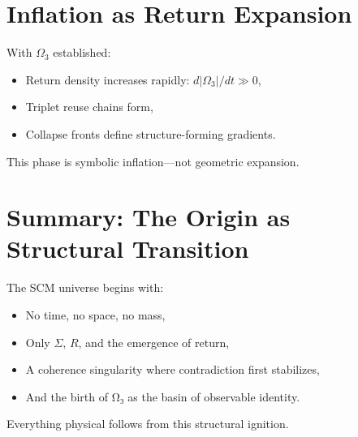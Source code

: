 \section{Inflation as Return Expansion} \label{sec:inflation-start}

With $\Omega_3$ established:
\begin{itemize}
  \item Return density increases rapidly: $d|\Omega_3|/dt \gg 0$,
  \item Triplet reuse chains form,
  \item Collapse fronts define structure-forming gradients.
\end{itemize}

This phase is symbolic inflation—not geometric expansion.

\section{Summary: The Origin as Structural Transition} \label{sec:origin-summary}

The SCM universe begins with:
\begin{itemize}
  \item No time, no space, no mass,
  \item Only $\Sigma$, $R$, and the emergence of return,
  \item A coherence singularity where contradiction first stabilizes,
  \item And the birth of Ω₃ as the basin of observable identity.
\end{itemize}

Everything physical follows from this structural ignition.

